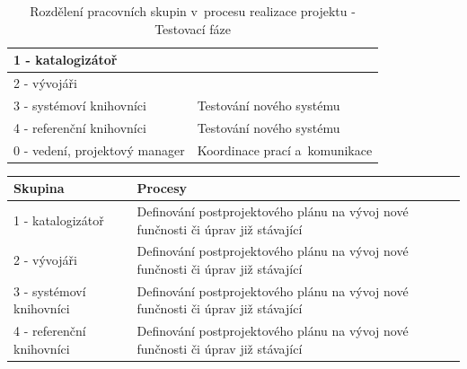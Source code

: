 \documentclass[
	11pt, oneside, printed, final, palatino, monochrome
	microtype,
	table,   %
	lof,     %
	lot     %
]{fithesis3}
\newcommand{\bold}[1]{\textbf{#1}}
\begin{document}
{\begin{table}
\begin{tabular}{| p{3cm} | p{8.3cm} |}
	1 - katalogizátoř
    & 

    \\ \hline
    
	2 - vývojáři
    & 

    \\ \hline
    
	3 - systémoví knihovníci
    & 
    Testování nového systému
    \\ \hline
    
	4 - referenční knihovníci
    & 
    Testování nového systému
    \\ \hline
    
	0 - vedení, projektový manager
    & 
    Koordinace prací a~komunikace
    \\ \hline
    
    \end{tabular}
    \caption{Rozdělení pracovních skupin v~procesu realizace projektu - Testovací fáze}
\end{table}

\begin{table}
    \centering
    \begin{tabular}{| p{3cm} | p{8.3cm} |}
    \hline
    \bold{Skupina} 	
    & 
    \bold{Procesy} 
    \\ \hline
    
	1 - katalogizátoř
    & 
	Definování postprojektového plánu na vývoj nové funčnosti či úprav již stávající
    \\ \hline
    
	2 - vývojáři
    & 
	Definování postprojektového plánu na vývoj nové funčnosti či úprav již stávající
    \\ \hline
    
	3 - systémoví knihovníci
    & 
    Definování postprojektového plánu na vývoj nové funčnosti či úprav již stávající
    \\ \hline
    
	4 - referenční knihovníci
    & 
    Definování postprojektového plánu na vývoj nové funčnosti či úprav již stávající
    \\ \hline
    

\end{tabular}
\end{table}}
\end{document}
